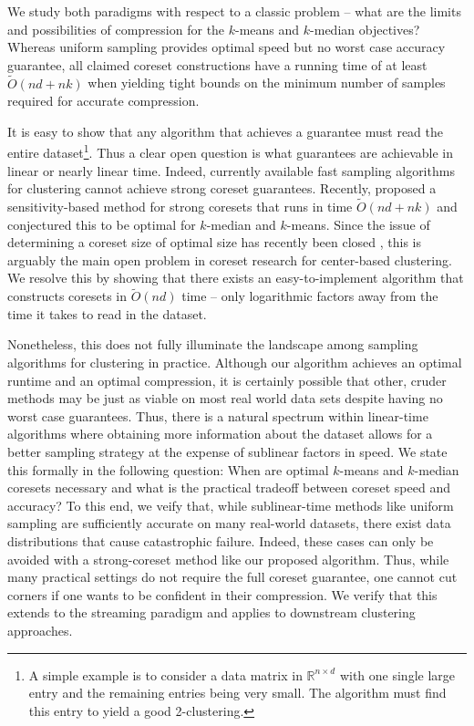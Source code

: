 We study both paradigms with respect to a classic problem -- what are the limits and possibilities of compression for the $k$-means and $k$-median objectives?
Whereas uniform sampling provides optimal speed but no worst case accuracy guarantee, all claimed coreset constructions have a running time of at least
$\tilde{O}(nd+nk)$ when yielding tight bounds on the minimum number of samples required for accurate compression. 

It is easy to show that any algorithm that achieves a guarantee must read the entire dataset\footnote{A simple example is to consider a data matrix in
$\mathbb{R}^{n \times d}$ with one single large entry and the remaining entries being very small. The algorithm must find this entry to yield a good
2-clustering.}. Thus a clear open question is what guarantees are achievable in linear or nearly linear time. Indeed, currently available fast sampling
algorithms for clustering \cite{BachemL018} \cite{kmeans_sublinear_bachem16} cannot achieve strong coreset guarantees.  Recently, \cite{DSWY22} proposed
a sensitivity-based method for strong coresets that runs in time $\tilde{O}(nd + nk)$ and conjectured this to be optimal for $k$-median and $k$-means.  Since
the issue of determining a coreset size of optimal size has recently been closed \cite{CSS21,CLSSS22,huangLB}, this is arguably the main open problem in coreset
research for center-based clustering. We resolve this by showing that there exists an easy-to-implement algorithm that constructs coresets in $\tilde{O}(nd)$
time -- only logarithmic factors away from the time it takes to read in the dataset.

Nonetheless, this does not fully illuminate the landscape among sampling algorithms for clustering in practice. Although our algorithm achieves an optimal
runtime and an optimal compression, it is certainly possible that other, cruder methods may be just as viable on most real world data sets despite having no
worst case guarantees.  Thus, there is a natural spectrum within linear-time algorithms where obtaining more information about the dataset allows for a better
sampling strategy at the expense of sublinear factors in speed. We state this formally in the following question: When are optimal $k$-means and $k$-median
coresets necessary and what is the practical tradeoff between coreset speed and accuracy? To this end, we veify that, while sublinear-time methods like uniform
sampling are sufficiently accurate on many real-world datasets, there exist data distributions that cause catastrophic failure. Indeed, these cases can only be
avoided with a strong-coreset method like our proposed algorithm. Thus, while many practical settings do not require the full coreset guarantee, one cannot cut
corners if one wants to be confident in their compression. We verify that this extends to the streaming paradigm and applies to downstream clustering
approaches.

